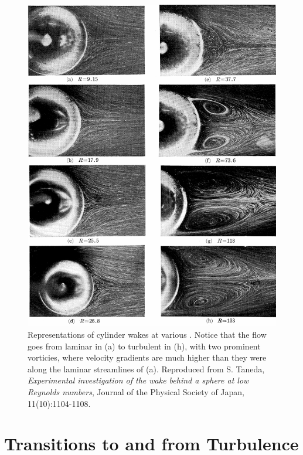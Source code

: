 \begin{figure}[h]
\centerline{
\includegraphics[scale=0.4]{Figs/ReCylinder}}
\caption{Representations of cylinder wakes at various \ReN. Notice that the flow goes from laminar in (a) to turbulent in (h), with two prominent vorticies, where velocity gradients are much higher than they were along the laminar streamlines of (a). Reproduced from S. Taneda, \emph{Experimental investigation of the wake behind a sphere at low Reynolds numbers}, Journal of the Physical Society of Japan,  11(10):1104-1108.}\label{fig:cylinderWake}
\end{figure}

\section{Transitions to and from Turbulence}

